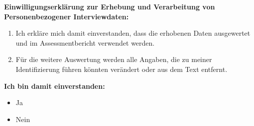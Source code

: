 \documentclass{article}
\begin{document}
\vspace{1cm}

\textbf{Einwilligungserklärung zur Erhebung und Verarbeitung von Personenbezogener Interviewdaten:}

\begin{enumerate}
\item Ich erkläre mich damit einverstanden, dass die erhobenen Daten ausgewertet und im Assessmentbericht verwendet werden.   
\item Für die weitere Auswertung werden alle Angaben, die zu meiner Identifizierung führen könnten verändert oder aus dem Text entfernt.
\end{enumerate}

\textbf{Ich bin damit einverstanden:}

\begin{itemize}[label={\Square}] 
\item Ja
\item Nein
\end{itemize} 
\bigskip
\end{document}
